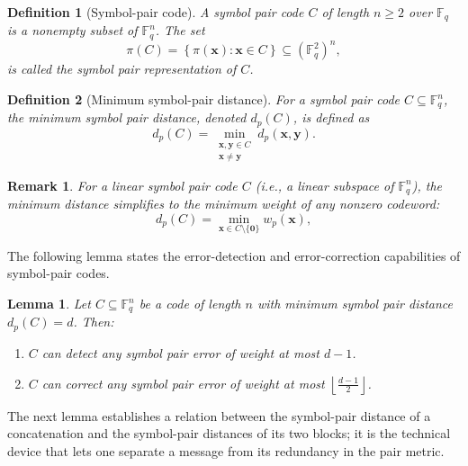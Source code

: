 \documentclass[11pt,draftclsnofoot,journal,onecolumn]{IEEEtran}
\newtheorem{definition}{Definition}
\newtheorem{lemma}{Lemma}
\newtheorem{remark}{Remark}
\begin{document}
    \begin{definition}[Symbol-pair code]
    \label{def:pair_code}
    A \emph{symbol pair code} $C$ of length $n \geq 2$ over $\mathbb{F}_q$ is a nonempty subset of $\mathbb{F}_q^n$. The set
    \[
    \pi(C) = \left\{ \pi(\mathbf{x}) : \mathbf{x} \in C \right\} \subseteq (\mathbb{F}_q^2)^n,
    \]
    is called the \emph{symbol pair representation} of $C$.
    \end{definition}

    \begin{definition}[Minimum symbol-pair distance]
    \label{def:min_pair_dist}
    For a symbol pair code $C \subseteq \mathbb{F}_q^n$, the \emph{minimum symbol pair distance}, denoted $d_p(C)$, is defined as
    \[
    d_p(C) = \min_{\substack{\mathbf{x}, \mathbf{y} \in C \\ \mathbf{x} \neq \mathbf{y}}} d_p(\mathbf{x}, \mathbf{y}).
    \]
    \end{definition}

    \begin{remark}
    For a linear symbol pair code $C$ (i.e., a linear subspace of $\mathbb{F}_q^n$), the minimum distance simplifies to the minimum weight of any nonzero codeword:
    \[
    d_p(C) = \min_{\mathbf{x} \in C \setminus \{\mathbf{0}\}} w_p(\mathbf{x}),
    \]
    \end{remark}
    The following lemma states the error-detection and error-correction capabilities of symbol-pair codes.
    \begin{lemma}
    \label{lem:pair_correction}
    Let $C \subseteq \mathbb{F}_q^n$ be a code of length $n$ with minimum symbol pair distance $d_p(C) = d$. Then:
    \begin{enumerate}
    \item $C$ can detect any symbol pair error of weight at most $d-1$.
    \item $C$ can correct any symbol pair error of weight at most $\left\lfloor \frac{d-1}{2} \right\rfloor$.
    \end{enumerate}
    \end{lemma}

    The next lemma establishes a relation between the symbol-pair distance of a concatenation and the symbol-pair distances of its two blocks; it is the technical device that lets one separate a message from its redundancy in the pair metric.
\end{document}
